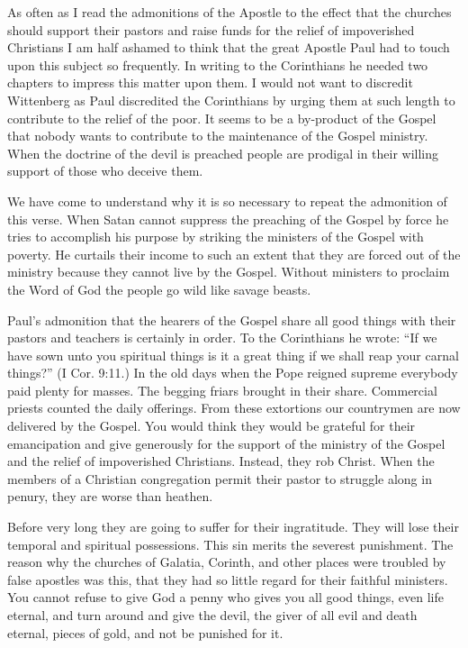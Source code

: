 As often as I read the admonitions of the Apostle to the effect that the churches should support their pastors and raise funds for the relief of impoverished Christians I am half ashamed to think that the great Apostle Paul had to touch upon this subject so frequently. In writing to the Corinthians he needed two chapters to impress this matter upon them. I would not want to discredit Wittenberg as Paul discredited the Corinthians by urging them at such length to contribute to the relief of the poor. It seems to be a by-product of the Gospel that nobody wants to contribute to the maintenance of the Gospel ministry. When the doctrine of the devil is preached people are prodigal in their willing support of those who deceive them.

We have come to understand why it is so necessary to repeat the admonition of this verse. When Satan cannot suppress the preaching of the Gospel by force he tries to accomplish his purpose by striking the ministers of the Gospel with poverty. He curtails their income to such an extent that they are forced out of the ministry because they cannot live by the Gospel. Without ministers to proclaim the Word of God the people go wild like savage beasts.

Paul’s admonition that the hearers of the Gospel share all good things with their pastors and teachers is certainly in order. To the Corinthians he wrote: “If we have sown unto you spiritual things is it a great thing if we shall reap your carnal things?” (I Cor. 9:11.) In the old days when the Pope reigned supreme everybody paid plenty for masses. The begging friars brought in their share. Commercial priests counted the daily offerings. From these extortions our countrymen are now delivered by the Gospel. You would think they would be grateful for their emancipation and give generously for the support of the ministry of the Gospel and the relief of impoverished Christians. Instead, they rob Christ. When the members of a Christian congregation permit their pastor to struggle along in penury, they are worse than heathen.

Before very long they are going to suffer for their ingratitude. They will lose their temporal and spiritual possessions. This sin merits the severest punishment. The reason why the churches of Galatia, Corinth, and other places were troubled by false apostles was this, that they had so little regard for their faithful ministers. You cannot refuse to give God a penny who gives you all good things, even life eternal, and turn around and give the devil, the giver of all evil and death eternal, pieces of gold, and not be punished for it.

